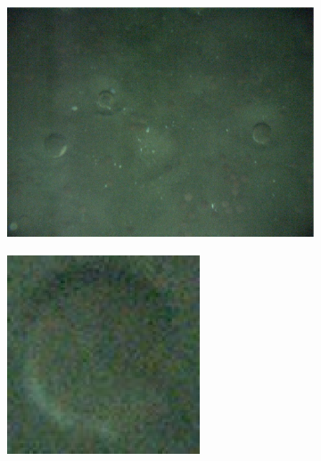 \documentclass {udthesis}
\begin{document}
\begin{figure}
\begin{minipage}[c]{\textwidth}
\begin{subfigure}[]{0.33\textwidth}
	\caption{}
	\label{subfig:dawkins_hist}
    \end{subfigure}
  \end{minipage} 

  \vskip 10pt
  \begin{minipage}[c]{\textwidth}
  \centering
    \begin{subfigure}[]{\textwidth}
	\includegraphics[height=0.24\textwidth]{60} 
  	\caption{}
	\label{subfig:typical}
  \end{subfigure}
    \begin{subfigure}[]{0.235\textwidth}
	\includegraphics[width=\textwidth]{our_crop_resize}
	\caption{}
	\label{subfig:typical_crop}
	\hskip 15pt
    \end{subfigure}
    \begin{subfigure}[]{0.35\textwidth}

\end{subfigure}
\end{minipage}
\end{figure}
\end{document}
